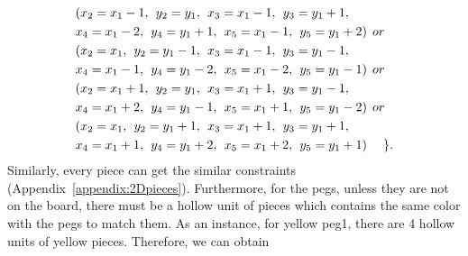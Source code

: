 \begin{equation}
\begin{aligned}
&(x_{2} = x_{1}-1 ,\hspace{1ex}y_{2} = y_{1},\hspace{1ex}x_{3} = x_{1}-1,\hspace{1ex}y_{3} = y_{1}+1,
\\&x_{4} = x_{1}-2,\hspace{1ex}y_{4} = y_{1}+1,\hspace{1ex}x_{5} = x_{1}-1,\hspace{1ex}y_{5} = y_{1}+2)\hspace{1ex} or \\
&(x_{2} = x_{1} ,\hspace{1ex}y_{2} = y_{1}-1,\hspace{1ex}x_{3} = x_{1}-1,\hspace{1ex}y_{3} = y_{1}-1,
\\&x_{4} = x_{1}-1,\hspace{1ex}y_{4} = y_{1}-2,\hspace{1ex}x_{5} = x_{1}-2,\hspace{1ex}y_{5} = y_{1}-1)\hspace{1ex} or \\
&(x_{2} = x_{1}+1 ,\hspace{1ex}y_{2} = y_{1},\hspace{1ex}x_{3} = x_{1}+1,\hspace{1ex}y_{3} = y_{1}-1,
\\&x_{4} = x_{1}+2,\hspace{1ex}y_{4} = y_{1}-1,\hspace{1ex}x_{5} = x_{1}+1,\hspace{1ex}y_{5} = y_{1}-2)\hspace{1ex} or \\
&(x_{2} = x_{1} ,\hspace{1ex}y_{2} = y_{1}+1,\hspace{1ex}x_{3} = x_{1}+1,\hspace{1ex}y_{3} = y_{1}+1,
\\&x_{4} = x_{1}+1,\hspace{1ex}y_{4} = y_{1}+2,\hspace{1ex}x_{5} = x_{1}+2,\hspace{1ex}y_{5} = y_{1}+1)\hspace{3ex}\}.
\end{aligned}
\end{equation}
Similarly, every piece can get the similar constraints (Appendix~\ref{appendix:2Dpieces}). Furthermore, for the pegs, unless they are not on the board, there must be a hollow unit of pieces which contains the same color with the pegs to match them. As an instance, for yellow peg1, there are 4 hollow units of yellow pieces. Therefore, we can obtain
